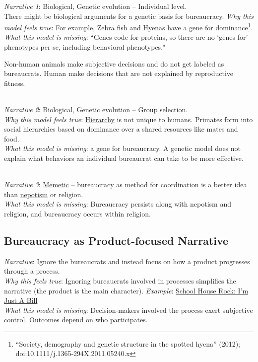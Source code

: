 \textit{Narrative 1}: Biological, Genetic evolution -- Individual level. \\
There might be biological arguments for a genetic basis for bureaucracy. 
\textit{Why this model feels true}: For example, Zebra fish and Hyenas have a gene for dominance\footnote{``Society, demography and genetic structure in the spotted hyena'' (2012); doi:10.1111/j.1365-294X.2011.05240.x}. \\
\textit{What this model is missing}: ``Genes code for proteins, so there are no `genes for' phenotypes per se, including behavioral phenotypes."~\cite{2015_Lilienfeld}

Non-human animals make subjective decisions and do not get labeled as bureaucrats. Human make decisions that are not explained by reproductive fitness.

\ \\
\textit{Narrative 2}: Biological, Genetic evolution -- Group selection. \\
\textit{Why this model feels true}: \hyperref[sec:hierarchy-of-roles]{Hierarchy}
is not unique to humans. Primates form into social hierarchies based on dominance over a shared resources like mates and food. \\
\textit{What this model is missing}: a gene for bureaucracy. A genetic model does not explain what behaviors an individual bureaucrat can take to be more effective. 

\ \\
\textit{Narrative 3}: \href{https://en.wikipedia.org/wiki/Memetics}{Memetic}
-- bureaucracy as method for coordination is a better idea than \href{https://en.wikipedia.org/wiki/Nepotism}{nepotism} 
or religion. \\
\textit{What this model is missing}: Bureaucracy persists along with nepotism and religion, and bureaucracy occurs within religion. 

\subsection*{Bureaucracy as Product-focused Narrative}
\textit{Narrative}: Ignore the bureaucrats and instead focus on how a product progresses through a process.\\
\textit{Why this feels true}: Ignoring bureaucrats involved in processes simplifies the narrative (the product is the main character). 
\textit{Example}: \href{https://www.youtube.com/watch?v=OgVKvqTItto}{School House Rock: I'm Just A Bill}\\
\textit{What this model is missing}: Decision-makers involved the process exert subjective control. Outcomes depend on who participates. 

